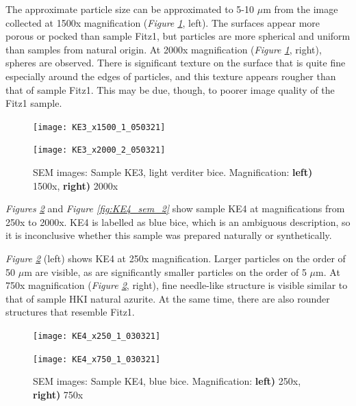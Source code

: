 The approximate particle size can be approximated to 5-10 $\mu$m from the image collected at 1500x magnification (\textit{Figure \ref{fig:KE3_sem_2}}, left). The surfaces appear more porous or pocked than sample Fitz1, but particles are more spherical and uniform than samples from natural origin. At 2000x magnification (\textit{Figure \ref{fig:KE3_sem_2}}, right), spheres are observed. There is significant texture on the surface that is quite fine especially around the edges of particles, and this texture appears rougher than that of sample Fitz1. This may be due, though, to poorer image quality of the Fitz1 sample.

\begin{figure}[H]
\centering
\begin{minipage}{.45\textwidth}
  \centering
  \texttt{[image: KE3\_x1500\_1\_050321]}
\end{minipage}
\begin{minipage}{.45\textwidth}
  \centering
  \texttt{[image: KE3\_x2000\_2\_050321]}
\end{minipage}
\caption[SEM images: Sample KE3, light verditer bice]{SEM images: Sample KE3, light verditer bice. Magnification: \textbf{left)} 1500x, \textbf{right)} 2000x}
\label{fig:KE3_sem_2}
\end{figure}


\textit{Figures \ref{fig:KE4_sem_1}} and \textit{Figure \ref{fig:KE4_sem_2}} show sample KE4 at magnifications from 250x to 2000x. KE4 is labelled as blue bice, which is an ambiguous description, so it is inconclusive whether this sample was prepared naturally or synthetically.

\textit{Figure \ref{fig:KE4_sem_1}} (left) shows KE4 at 250x magnification. Larger particles on the order of 50 $\mu$m are visible, as are significantly smaller particles on the order of 5 $\mu$m. At 750x magnification (\textit{Figure \ref{fig:KE4_sem_1}}, right), fine needle-like structure is visible similar to that of sample HKI natural azurite. At the same time, there are also rounder structures that resemble Fitz1. 

\begin{figure}[H]
\centering
\begin{minipage}{.45\textwidth}
  \centering
  \texttt{[image: KE4\_x250\_1\_030321]}
\end{minipage}
\begin{minipage}{.45\textwidth}
  \centering
  \texttt{[image: KE4\_x750\_1\_030321]}
\end{minipage}
\caption[SEM images: Sample KE4, blue bice]{SEM images: Sample KE4, blue bice. Magnification: \textbf{left)} 250x, \textbf{right)} 750x}
\label{fig:KE4_sem_1}
\end{figure}

